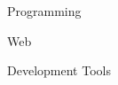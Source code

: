 

\begin{cventries}
\cventrytech
    {Programming}
    {
        \diPythonPlainWordmark
        \diCplusplusPlainWordmark
        \diCPlainWordmark
        \diJavascriptPlain
        \diJavaPlainWordmark
    }

\cventrytech
    {Web}
    {
        \diHtmlFivePlainWordmark
        \diCssThreePlainWordmark
        \diBootstrapPlainWordmark
        \diJqueryPlainWordmark
        \diExpressOriginalWordmark
        \diNodejsPlainWordmark
        \diFlaskOriginalWordmark
        \diPostgresqlPlainWordmark 
        \diReactPlainWordmark
    }

\cventrytech
    {Development Tools}
    {
        
        \diVimPlain
        \diGitPlainWordmark
        \diSshPlainWordmark
        \diSlackPlainWordmark
        \diDockerPlainWordmark
    }
    
\end{cventries}
